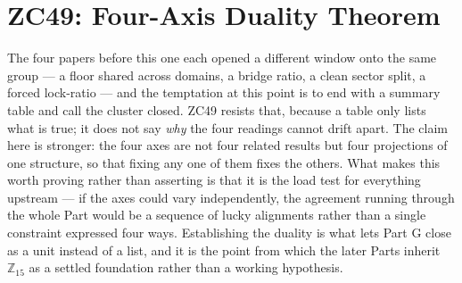 \documentclass[12pt, a4paper]{article}
\begin{document}
\newpage

\section{ZC49: Four-Axis Duality Theorem}
\label{sec:zc49}

The four papers before this one each opened a different window onto the same
group --- a floor shared across domains, a bridge ratio, a clean sector split, a
forced lock-ratio --- and the temptation at this point is to end with a summary
table and call the cluster closed. ZC49 resists that, because a table only lists
what is true; it does not say \emph{why} the four readings cannot drift apart.
The claim here is stronger: the four axes are not four related results but four
projections of one structure, so that fixing any one of them fixes the others.
What makes this worth proving rather than asserting is that it is the load test
for everything upstream --- if the axes could vary independently, the agreement
running through the whole Part would be a sequence of lucky alignments rather
than a single constraint expressed four ways. Establishing the duality is what
lets Part G close as a unit instead of a list, and it is the point from which
the later Parts inherit $\mathbb{Z}_{15}$ as a settled foundation rather than a
working hypothesis.
\end{document}
